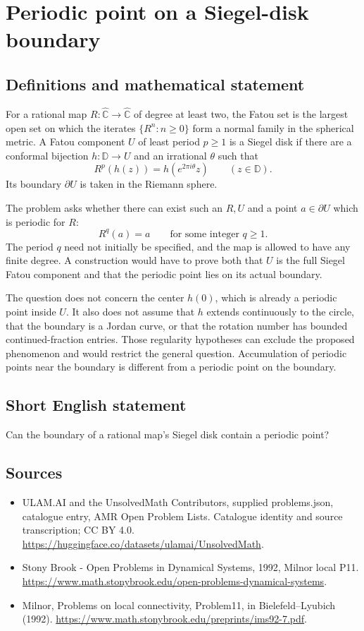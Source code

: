\documentclass[11pt,a4paper]{article}
\begin{document}
\section*{Periodic point on a Siegel-disk boundary}\label{statement}

\subsection{Definitions and mathematical statement}
For a rational map $R:\widehat{\mathbb C}\to\widehat{\mathbb C}$ of
degree at least two, the Fatou set is the largest open set on which
the iterates $\{R^n:n\ge0\}$ form a normal family in the spherical
metric. A Fatou component $U$ of least period $p\ge1$ is a Siegel
disk if there are a conformal bijection $h:\mathbb D\to U$ and an
irrational $\theta$ such that
\[
 R^p(h(z))=h(e^{2\pi i\theta}z)\qquad(z\in\mathbb D).
\]
Its boundary $\partial U$ is taken in the Riemann sphere.

The problem asks whether there can exist such an $R,U$ and a point
$a\in\partial U$ which is periodic for $R$:
\[
 R^q(a)=a\qquad\text{for some integer }q\ge1.
\]
The period $q$ need not initially be specified, and the map is allowed
to have any finite degree. A construction would have to prove both
that $U$ is the full Siegel Fatou component and that the periodic
point lies on its actual boundary.

The question does not concern the center $h(0)$, which is already a
periodic point inside $U$. It also does not assume that $h$ extends
continuously to the circle, that the boundary is a Jordan curve, or
that the rotation number has bounded continued-fraction entries.
Those regularity hypotheses can exclude the proposed phenomenon and
would restrict the general question. Accumulation of periodic points
near the boundary is different from a periodic point on the boundary.
\subsection{Short English statement}
Can the boundary of a rational map’s Siegel disk contain a periodic point?
\subsection{Sources}
\begin{itemize}
\item[S1] ULAM.AI and the UnsolvedMath Contributors, supplied problems.json, catalogue entry, AMR Open Problem Lists. Catalogue identity and source transcription; CC BY 4.0.
\url{https://huggingface.co/datasets/ulamai/UnsolvedMath}.
\item[S2] Stony Brook - Open Problems in Dynamical Systems, 1992, Milnor local P11. 
\url{https://www.math.stonybrook.edu/open-problems-dynamical-systems}.
\item[S3] Milnor, Problems on local connectivity, Problem11, in Bielefeld–Lyubich (1992).
\url{https://www.math.stonybrook.edu/preprints/ims92-7.pdf}.
\end{itemize}
\end{document}
